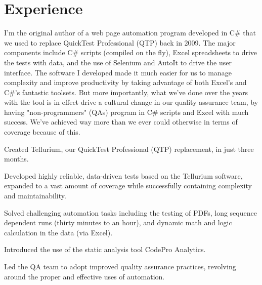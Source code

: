 \documentclass[letterpaper]{deedy-resume} %
\begin{document}
\begin{minipage}[t]{0.64\textwidth} %


\section{Experience}


\vspace{\topsep} %
I'm the original author of a web page automation program developed in C\# that we used to replace QuickTest Professional (QTP) back in 2009. The major components include C\# scripts (compiled on the fly), Excel spreadsheets to drive the tests with data, and the use of Selenium and AutoIt to drive the user interface.
\newline \newline
The software I developed made it much easier for us to manage complexity and improve productivity by taking advantage of both Excel's and C\#'s fantastic toolsets. But more importantly, what we've done over the years with the tool is in effect drive a cultural change in our quality assurance team, by having "non-programmers" (QAs) program in C\# scripts and Excel with much success. We've achieved way more than we ever could otherwise in terms of coverage because of this.
\vspace{\topsep} %
\begin{tightitemize}
\item Created Tellurium, our QuickTest Professional (QTP) replacement, in just three months.
\item Developed highly reliable, data-driven tests based on the Tellurium software, expanded to a vast amount of coverage while successfully containing complexity and maintainability.
\item Solved challenging automation tasks including the testing of PDFs, long sequence dependent runs (thirty minutes to an hour), and dynamic math and logic calculation in the data (via Excel).
\item Introduced the use of the static analysis tool CodePro Analytics.
\item Led the QA team to adopt improved quality assurance practices, revolving around the proper and effective uses of automation.
\end{tightitemize}


\end{minipage}
\end{document}
